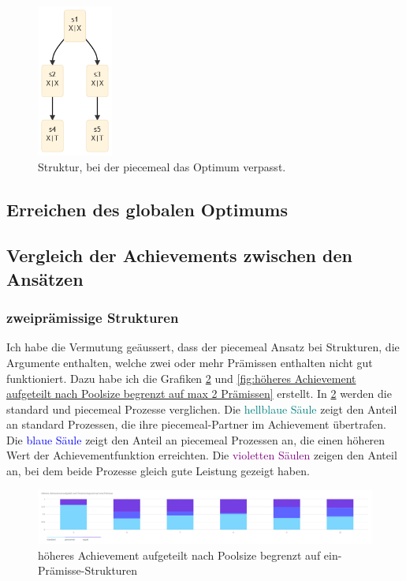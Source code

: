 \documentclass{article}
\begin{document}
\begin{figure}[ht]
  \centering
  \includegraphics[width=\textwidth,height=5cm,keepaspectratio]{images/missed_optima.png}
  \caption{Struktur, bei der piecemeal das Optimum verpasst.\label{fig:missed_optima}}
\end{figure}


\subsection{Erreichen des globalen Optimums}

\subsection{Vergleich der Achievements zwischen den Ansätzen}

\subsubsection{zweiprämissige Strukturen}

Ich habe die Vermutung geäussert, dass der piecemeal Ansatz bei Strukturen, die Argumente enthalten, welche zwei oder mehr Prämissen enthalten nicht gut funktioniert. Dazu habe ich die Grafiken \ref{fig:höheres Achievement aufgeteilt nach Poolsize begrenzt auf eine Prämisse} und \ref{fig:höheres Achievement aufgeteilt nach Poolsize begrenzt auf max 2 Prämissen} erstellt. In \ref{fig:höheres Achievement aufgeteilt nach Poolsize begrenzt auf eine Prämisse} werden die standard und piecemeal Prozesse verglichen. Die \textcolor{teal}{hellblaue Säule} zeigt den Anteil an standard Prozessen, die ihre piecemeal-Partner im Achievement übertrafen. Die \textcolor{blue}{blaue Säule} zeigt den Anteil an piecemeal Prozessen an, die einen höheren Wert der Achievementfunktion erreichten. Die \textcolor{purple}{violetten Säulen} zeigen den Anteil an, bei dem beide Prozesse gleich gute Leistung gezeigt haben.

\begin{figure}[ht]
  \centering
  \includegraphics[width=\textwidth]{höheres Achievement aufgeteilt nach Poolsize begrenzt auf eine Prämisse}
  \caption{höheres Achievement aufgeteilt nach Poolsize begrenzt auf ein-Prämisse-Strukturen\label{fig:höheres Achievement aufgeteilt nach Poolsize begrenzt auf eine Prämisse}}
\end{figure}
\end{document}
